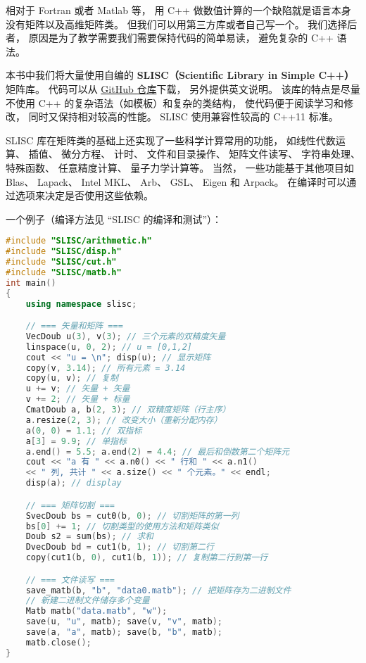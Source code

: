 

相对于 Fortran 或者 Matlab 等， 用 C++ 做数值计算的一个缺陷就是语言本身没有矩阵以及高维矩阵类。 但我们可以用第三方库或者自己写一个。 我们选择后者， 原因是为了教学需要我们需要保持代码的简单易读， 避免复杂的 C++ 语法。

本书中我们将大量使用自编的 \textbf{SLISC（Scientific Library in Simple C++）} 矩阵库。 代码可以从 \href{https://github.com/MacroUniverse/SLISC}{GitHub 仓库}下载， 另外提供英文说明。 该库的特点是尽量不使用 C++ 的复杂语法（如模板）和复杂的类结构， 使代码便于阅读学习和修改， 同时又保持相对较高的性能。 SLISC 使用兼容性较高的 C++11 标准。

SLISC 库在矩阵类的基础上还实现了一些科学计算常用的功能， 如线性代数运算、 插值、 微分方程、 计时、 文件和目录操作、 矩阵文件读写、 字符串处理、 特殊函数、 任意精度计算、 量子力学计算等。 当然， 一些功能基于其他项目如 Blas、 Lapack、 Intel MKL、 Arb、 GSL、 Eigen 和 Arpack。 在编译时可以通过选项来决定是否使用这些依赖。

一个例子（编译方法见 “SLISC 的编译和测试”）：
\begin{lstlisting}[language=cpp, caption=intro.cpp]
#include "SLISC/arithmetic.h"
#include "SLISC/disp.h"
#include "SLISC/cut.h"
#include "SLISC/matb.h"
int main()
{
	using namespace slisc;

	// === 矢量和矩阵 ===
	VecDoub u(3), v(3); // 三个元素的双精度矢量
	linspace(u, 0, 2); // u = [0,1,2]
	cout << "u = \n"; disp(u); // 显示矩阵
	copy(v, 3.14); // 所有元素 = 3.14
	copy(u, v); // 复制
	u += v; // 矢量 + 矢量
	v += 2; // 矢量 + 标量
	CmatDoub a, b(2, 3); // 双精度矩阵（行主序）
	a.resize(2, 3); // 改变大小（重新分配内存）
	a(0, 0) = 1.1; // 双指标
	a[3] = 9.9; // 单指标
	a.end() = 5.5; a.end(2) = 4.4; // 最后和倒数第二个矩阵元
	cout << "a 有 " << a.n0() << " 行和 " << a.n1()
	<< " 列, 共计 " << a.size() << " 个元素。" << endl;
	disp(a); // display

	// === 矩阵切割 ===
	SvecDoub bs = cut0(b, 0); // 切割矩阵的第一列
	bs[0] += 1; // 切割类型的使用方法和矩阵类似
	Doub s2 = sum(bs); // 求和
	DvecDoub bd = cut1(b, 1); // 切割第二行
	copy(cut1(b, 0), cut1(b, 1)); // 复制第二行到第一行

	// === 文件读写 ===
	save_matb(b, "b", "data0.matb"); // 把矩阵存为二进制文件
	// 新建二进制文件储存多个变量
	Matb matb("data.matb", "w");
	save(u, "u", matb); save(v, "v", matb);
	save(a, "a", matb); save(b, "b", matb);
	matb.close();
}
\end{lstlisting}

